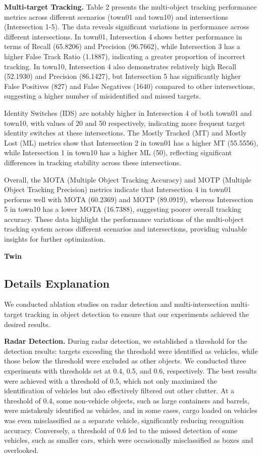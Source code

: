 \textbf{Multi-target Tracking.}
Table 2 presents the multi-object tracking performance metrics across different scenarios (town01 and town10) and intersections (Intersection 1-5). 
The data reveals significant variations in performance across different intersections. 
In town01, Intersection 4 shows better performance in terms of Recall (65.8206) and Precision (96.7662), while Intersection 3 has a higher False Track Ratio (1.1887), indicating a greater proportion of incorrect tracking. 
In town10, Intersection 4 also demonstrates relatively high Recall (52.1930) and Precision (86.1427), but Intersection 5 has significantly higher False Positives (827) and False Negatives (1640) compared to other intersections, suggesting a higher number of misidentified and missed targets.

Identity Switches (IDS) are notably higher in Intersection 4 of both town01 and town10, with values of 20 and 50 respectively, indicating more frequent target identity switches at these intersections. 
The Mostly Tracked (MT) and Mostly Lost (ML) metrics show that Intersection 2 in town01 has a higher MT (55.5556), while Intersection 1 in town10 has a higher ML (50), reflecting significant differences in tracking stability across these intersections.

Overall, the MOTA (Multiple Object Tracking Accuracy) and MOTP (Multiple Object Tracking Precision) metrics indicate that Intersection 4 in town01 performs well with MOTA (60.2369) and MOTP (89.0919), whereas Intersection 5 in town10 has a lower MOTA (16.7388), suggesting poorer overall tracking accuracy. 
These data highlight the performance variations of the multi-object tracking system across different scenarios and intersections, providing valuable insights for further optimization.

\textbf{Twin}

\subsection{Details Explanation}

We conducted ablation studies on radar detection and multi-intersection multi-target tracking in object detection to ensure that our experiments achieved the desired results.

\textbf{Radar Detection.}
During radar detection, we established a threshold for the detection results: targets exceeding the threshold were identified as vehicles, while those below the threshold were excluded as other objects. 
We conducted three experiments with thresholds set at 0.4, 0.5, and 0.6, respectively. 
The best results were achieved with a threshold of 0.5, which not only maximized the identification of vehicles but also effectively filtered out other clutter. 
At a threshold of 0.4, some non-vehicle objects, such as large containers and barrels, were mistakenly identified as vehicles, and in some cases, cargo loaded on vehicles was even misclassified as a separate vehicle, significantly reducing recognition accuracy. 
Conversely, a threshold of 0.6 led to the missed detection of some vehicles, such as smaller cars, which were occasionally misclassified as boxes and overlooked.

